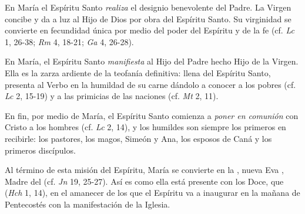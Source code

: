  En María el Espíritu Santo \emph{realiza} el designio benevolente del Padre. La Virgen concibe y da a luz al Hijo de Dios por obra del Espíritu Santo. Su virginidad se convierte en fecundidad única por medio del poder del Espíritu y de la fe (cf. \emph{Lc} 1, 26-38; \emph{Rm} 4, 18-21; \emph{Ga} 4, 26-28).

 En María, el Espíritu Santo \emph{manifiesta} al Hijo del Padre hecho Hijo de la Virgen. Ella es la zarza ardiente de la teofanía definitiva: llena del Espíritu Santo, presenta al Verbo en la humildad de su carne dándolo a conocer a los pobres (cf. \emph{Lc} 2, 15-19) y a las primicias de las naciones (cf. \emph{Mt} 2, 11).

 En fin, por medio de María, el Espíritu Santo comienza a \emph{poner en comunión} con Cristo a los hombres  (cf. \emph{Lc} 2, 14), y los humildes son siempre los primeros en recibirle: los pastores, los magos, Simeón y Ana, los esposos de Caná y los primeros discípulos.

 Al término de esta misión del Espíritu, María se convierte en la , nueva Eva , Madre del  (cf. \emph{Jn} 19, 25-27). Así es como ella está presente con los Doce, que  (\emph{Hch} 1, 14), en el amanecer de los  que el Espíritu va a inaugurar en la mañana de Pentecostés con la manifestación de la Iglesia.